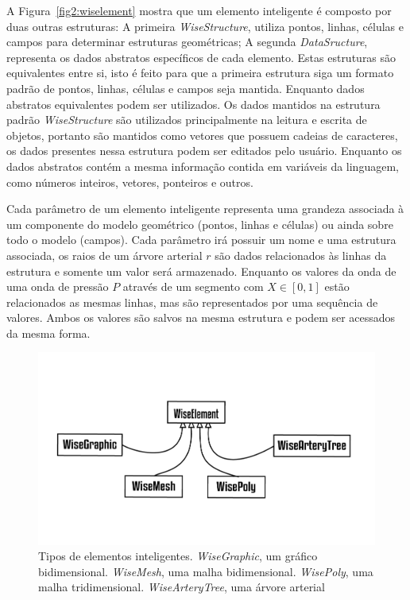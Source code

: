 \documentclass[a4paper,12pt]{monografia}
\theoremstyle{plain}
\theoremstyle{definition}
\theoremstyle{remark}
\begin{document}
A Figura~\ref{fig2:wiselement} mostra que um elemento inteligente é composto por duas outras estruturas: A primeira \textit{WiseStructure}, utiliza pontos, linhas, células e campos para determinar estruturas geométricas; A segunda \textit{DataSructure}, representa os dados abstratos específicos de cada elemento. Estas estruturas são equivalentes entre si, isto é feito para que a primeira estrutura siga um formato padrão de pontos, linhas, células e campos seja mantida. Enquanto dados abstratos equivalentes podem ser utilizados. Os dados mantidos na estrutura padrão \textit{WiseStructure} são utilizados principalmente na leitura e escrita de objetos, portanto são mantidos como vetores que possuem cadeias de caracteres, os dados presentes nessa estrutura podem ser editados pelo usuário. Enquanto os dados abstratos contém a mesma informação contida em variáveis da linguagem, como números inteiros, vetores, ponteiros e outros.

Cada parâmetro de um elemento inteligente representa uma grandeza associada à um componente do modelo geométrico (pontos,  linhas e células) ou ainda sobre todo o modelo (campos). Cada parâmetro irá possuir um nome e uma estrutura associada, os raios de um árvore arterial $r$ são dados relacionados às linhas da estrutura e somente um valor será armazenado. Enquanto os valores da onda de uma onda de pressão $P$ através de um segmento com $X \in [0,1]$ estão relacionados as mesmas linhas, mas são representados por uma sequência de valores. Ambos os valores são salvos na mesma estrutura e podem ser acessados da mesma forma.

\begin{figure}[!htbp]
	\centering
	\includegraphics[scale=1]{Figures/WiseElements.png}
	\caption{Tipos de elementos inteligentes. \textit{WiseGraphic}, um gráfico bidimensional. \textit{WiseMesh}, uma malha bidimensional. \textit{WisePoly}, uma malha tridimensional. \textit{WiseArteryTree}, uma árvore arterial}
	\label{fig2:wiselements}
\end{figure}
\end{document}
